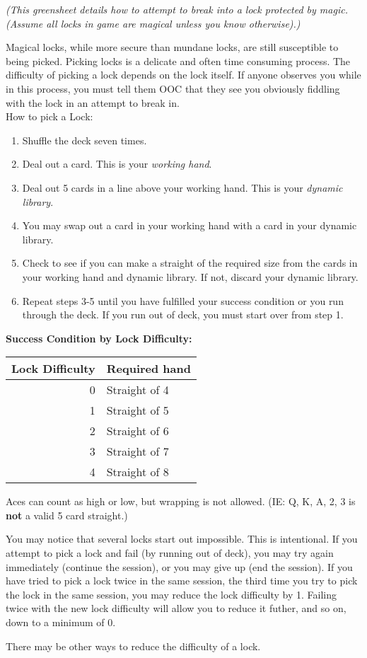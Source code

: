 \documentclass[green]{NeptuneBall}
\begin{document}
\name{\gDecking{}}

\emph{(This greensheet details how to attempt to break into a lock protected by magic. (Assume all locks in game are magical unless you know otherwise).)}

Magical locks, while more secure than mundane locks, are still susceptible to being picked. Picking locks is a delicate and often time consuming process. The difficulty of picking a lock depends on the lock itself. If anyone observes you while in this process, you must tell them OOC that they see you obviously fiddling with the lock in an attempt to break in.\\

How to pick a Lock:
\begin{enumerate}
	\item Shuffle the deck seven times.
	\item Deal out a card. This is your {\em working hand}.
	\item Deal out 5 cards in a line above your working hand. This is your {\em dynamic library}.
	\item You may swap out a card in your working hand with a card in your dynamic library.
	\item Check to see if you can make a straight of the required size from the cards in your working hand and dynamic library. If not, discard your dynamic library.
	\item Repeat steps 3-5 until you have fulfilled your success condition or you run through the deck.  If you run out of deck, you must start over from step 1.
\end{enumerate}

{\bf Success Condition by Lock Difficulty:}\\
\begin{tabular}{||r|l||}
\hline\hline
Lock Difficulty	& Required hand\\
\hline
0	& Straight of 4\\
1	& Straight of 5\\
2	& Straight of 6\\
3	& Straight of 7\\
4	& Straight of 8\\
\hline\hline 
\end{tabular}

\vspace{10 mm}

Aces can count as high or low, but wrapping is not allowed. (IE: Q, K, A, 2, 3 is {\bf not} a valid 5 card straight.)

You may notice that several locks start out impossible. This is intentional. If you attempt to pick a lock and fail (by running out of deck), you may try again immediately (continue the session), or you may give up (end the session). If you have tried to pick a lock twice in the same session, the third time you try to pick the lock in the same session, you may reduce the lock difficulty by 1. Failing twice with the new lock difficulty will allow you to reduce it futher, and so on, down to a minimum of 0.

There may be other ways to reduce the difficulty of a lock.
\end{document}
